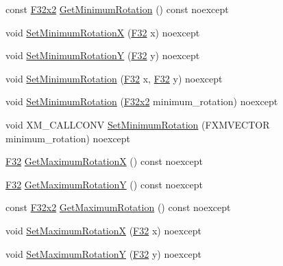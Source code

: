 \begin{DoxyCompactItemize}
\item 
const \hyperlink{namespacemage_aa87237ad091f5cd7da612b8523fc108f}{F32x2} \hyperlink{classmage_1_1script_1_1_mouse_look_script_a09e7e193cf2f5dca3342a130268a7a67}{Get\+Minimum\+Rotation} () const noexcept
\item 
void \hyperlink{classmage_1_1script_1_1_mouse_look_script_a07c261e34b3131114efacb0d0f6ae076}{Set\+Minimum\+RotationX} (\hyperlink{namespacemage_aa97e833b45f06d60a0a9c4fc22ae02c0}{F32} x) noexcept
\item 
void \hyperlink{classmage_1_1script_1_1_mouse_look_script_ab78678ccb7bdf6ac4093b7911bf81d54}{Set\+Minimum\+RotationY} (\hyperlink{namespacemage_aa97e833b45f06d60a0a9c4fc22ae02c0}{F32} y) noexcept
\item 
void \hyperlink{classmage_1_1script_1_1_mouse_look_script_a6964af9c1c264be02c37671019ab117f}{Set\+Minimum\+Rotation} (\hyperlink{namespacemage_aa97e833b45f06d60a0a9c4fc22ae02c0}{F32} x, \hyperlink{namespacemage_aa97e833b45f06d60a0a9c4fc22ae02c0}{F32} y) noexcept
\item 
void \hyperlink{classmage_1_1script_1_1_mouse_look_script_ab901aa0a3d22ef1e28f00db6f4f99aa1}{Set\+Minimum\+Rotation} (\hyperlink{namespacemage_aa87237ad091f5cd7da612b8523fc108f}{F32x2} minimum\+\_\+rotation) noexcept
\item 
void X\+M\+\_\+\+C\+A\+L\+L\+C\+O\+NV \hyperlink{classmage_1_1script_1_1_mouse_look_script_ab120a7b0d01acb64ae4287d716d89a09}{Set\+Minimum\+Rotation} (F\+X\+M\+V\+E\+C\+T\+OR minimum\+\_\+rotation) noexcept
\item 
\hyperlink{namespacemage_aa97e833b45f06d60a0a9c4fc22ae02c0}{F32} \hyperlink{classmage_1_1script_1_1_mouse_look_script_a5d0e63ee050bf07f5c8ad75ca9ced307}{Get\+Maximum\+RotationX} () const noexcept
\item 
\hyperlink{namespacemage_aa97e833b45f06d60a0a9c4fc22ae02c0}{F32} \hyperlink{classmage_1_1script_1_1_mouse_look_script_a24f48ac9e66f9c14645db71fd55ab9c6}{Get\+Maximum\+RotationY} () const noexcept
\item 
const \hyperlink{namespacemage_aa87237ad091f5cd7da612b8523fc108f}{F32x2} \hyperlink{classmage_1_1script_1_1_mouse_look_script_a2ceb928a903baf5b30ea99e321af671c}{Get\+Maximum\+Rotation} () const noexcept
\item 
void \hyperlink{classmage_1_1script_1_1_mouse_look_script_a538d1d81ac4220a0e20e3e5de5c8e3a6}{Set\+Maximum\+RotationX} (\hyperlink{namespacemage_aa97e833b45f06d60a0a9c4fc22ae02c0}{F32} x) noexcept
\item 
void \hyperlink{classmage_1_1script_1_1_mouse_look_script_af56c4be26dde7497d53bb9f48d1b1a55}{Set\+Maximum\+RotationY} (\hyperlink{namespacemage_aa97e833b45f06d60a0a9c4fc22ae02c0}{F32} y) noexcept

\end{DoxyCompactItemize}
